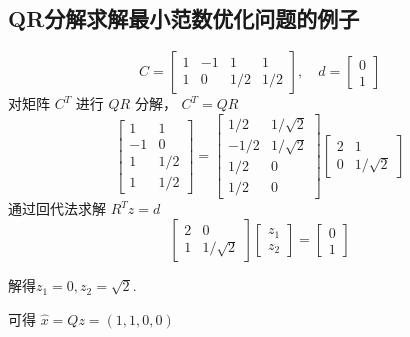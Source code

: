 \subsection{QR分解求解最小范数优化问题的例子}

\begin{example}
    \begin{equation}
C=\left[\begin{array}{cccc}
1 & -1 & 1 & 1 \\
1 & 0 & 1 / 2 & 1 / 2
\end{array}\right], \quad d=\left[\begin{array}{l}
0 \\
1
\end{array}\right]
\end{equation}
对矩阵 $ C^{T} $ 进行 $ Q R $ 分解， $ C^{T}=Q R $
\begin{equation}
\left[\begin{array}{cc}
1 & 1 \\
-1 & 0 \\
1 & 1 / 2 \\
1 & 1 / 2
\end{array}\right]=\left[\begin{array}{cc}
1 / 2 & 1 / \sqrt{2} \\
-1 / 2 & 1 / \sqrt{2} \\
1 / 2 & 0 \\
1 / 2 & 0
\end{array}\right]\left[\begin{array}{cc}
2 & 1 \\
0 & 1 / \sqrt{2}
\end{array}\right]
\end{equation}
通过回代法求解 $ R^{T} z=d $
\begin{equation}
\left[\begin{array}{cc}
2 & 0 \\
1 & 1 / \sqrt{2}
\end{array}\right]\left[\begin{array}{l}
z_{1} \\
z_{2}
\end{array}\right]=\left[\begin{array}{l}
0 \\
1
\end{array}\right]
\end{equation}

解得$
 z_{1}=0, z_{2}=\sqrt{2}
$.

可得 $ \hat{x}=Q z=(1,1,0,0) $
\end{example}

